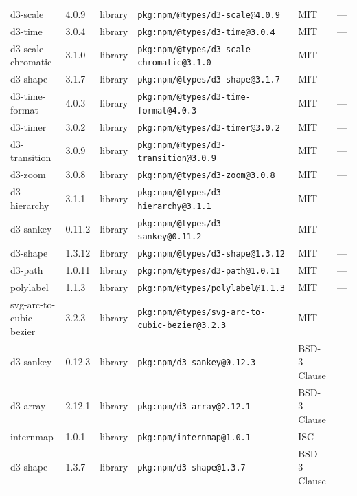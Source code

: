 \documentclass[11pt,a4paper]{article}
\begin{document}
\begin{longtable}{|p{4cm}|p{2cm}|p{1.6cm}|p{5cm}|p{1.5cm}|p{3.5cm}|}
\raggedright d3-scale & 4.0.9 & library & \small\texttt{pkg:npm/@types/d3-scale@4.0.9} & MIT & \small — \\
\raggedright d3-time & 3.0.4 & library & \small\texttt{pkg:npm/@types/d3-time@3.0.4} & MIT & \small — \\
\raggedright d3-scale-chromatic & 3.1.0 & library & \small\texttt{pkg:npm/@types/d3-scale-chromatic@3.1.0} & MIT & \small — \\
\raggedright d3-shape & 3.1.7 & library & \small\texttt{pkg:npm/@types/d3-shape@3.1.7} & MIT & \small — \\
\raggedright d3-time-format & 4.0.3 & library & \small\texttt{pkg:npm/@types/d3-time-format@4.0.3} & MIT & \small — \\
\raggedright d3-timer & 3.0.2 & library & \small\texttt{pkg:npm/@types/d3-timer@3.0.2} & MIT & \small — \\
\raggedright d3-transition & 3.0.9 & library & \small\texttt{pkg:npm/@types/d3-transition@3.0.9} & MIT & \small — \\
\raggedright d3-zoom & 3.0.8 & library & \small\texttt{pkg:npm/@types/d3-zoom@3.0.8} & MIT & \small — \\
\raggedright d3-hierarchy & 3.1.1 & library & \small\texttt{pkg:npm/@types/d3-hierarchy@3.1.1} & MIT & \small — \\
\raggedright d3-sankey & 0.11.2 & library & \small\texttt{pkg:npm/@types/d3-sankey@0.11.2} & MIT & \small — \\
\raggedright d3-shape & 1.3.12 & library & \small\texttt{pkg:npm/@types/d3-shape@1.3.12} & MIT & \small — \\
\raggedright d3-path & 1.0.11 & library & \small\texttt{pkg:npm/@types/d3-path@1.0.11} & MIT & \small — \\
\raggedright polylabel & 1.1.3 & library & \small\texttt{pkg:npm/@types/polylabel@1.1.3} & MIT & \small — \\
\raggedright svg-arc-to-cubic-bezier & 3.2.3 & library & \small\texttt{pkg:npm/@types/svg-arc-to-cubic-bezier@3.2.3} & MIT & \small — \\
\raggedright d3-sankey & 0.12.3 & library & \small\texttt{pkg:npm/d3-sankey@0.12.3} & BSD-3-Clause & \small — \\
\raggedright d3-array & 2.12.1 & library & \small\texttt{pkg:npm/d3-array@2.12.1} & BSD-3-Clause & \small — \\
\raggedright internmap & 1.0.1 & library & \small\texttt{pkg:npm/internmap@1.0.1} & ISC & \small — \\
\raggedright d3-shape & 1.3.7 & library & \small\texttt{pkg:npm/d3-shape@1.3.7} & BSD-3-Clause & \small — \\

\end{longtable}
\end{document}
